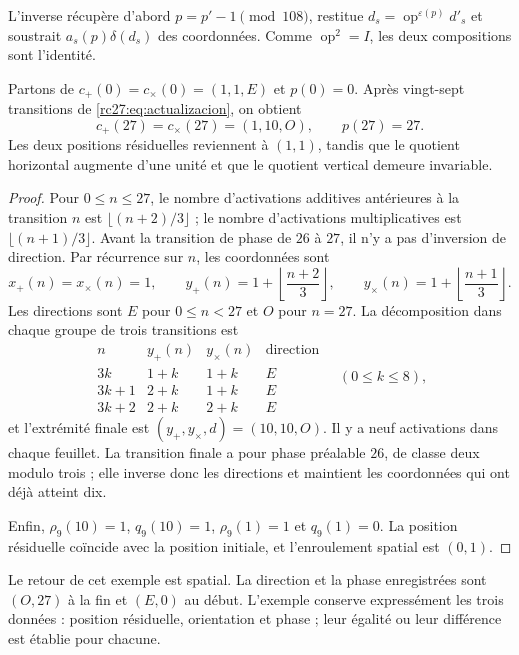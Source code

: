 L'inverse récupère d'abord $p=p'-1\pmod{108}$, restitue
$d_s=\operatorname{op}^{\varepsilon(p)}d'_s$ et soustrait
$a_s(p)\delta(d_s)$ des coordonnées. Comme
$\operatorname{op}^2=I$, les deux compositions sont l'identité.

\begin{theorem}
\label{rc27:thm:ejemplo}
Partons de
$c_+(0)=c_\times(0)=(1,1,E)$ et $p(0)=0$.
Après vingt-sept transitions de
\eqref{rc27:eq:actualizacion}, on obtient
\[
c_+(27)=c_\times(27)=(1,10,O),\qquad p(27)=27.
\]
Les deux positions résiduelles reviennent à $(1,1)$, tandis que le
quotient horizontal augmente d'une unité et que le quotient vertical demeure
invariable.
\end{theorem}
\begin{proof}
Pour $0\le n\le27$, le nombre d'activations additives antérieures
à la transition $n$ est $\lfloor(n+2)/3\rfloor$ ; le nombre
d'activations multiplicatives est $\lfloor(n+1)/3\rfloor$. Avant
la transition de phase de $26$ à $27$, il n'y a pas d'inversion de direction.
Par récurrence sur $n$, les coordonnées sont
\[
x_+(n)=x_\times(n)=1,\qquad
y_+(n)=1+\left\lfloor\frac{n+2}{3}\right\rfloor,\qquad
y_\times(n)=1+\left\lfloor\frac{n+1}{3}\right\rfloor.
\]
Les directions sont $E$ pour $0\le n<27$ et $O$ pour $n=27$.
La décomposition dans chaque groupe de trois transitions est
\[
\begin{array}{c|c|c|c}
n&y_+(n)&y_\times(n)&\text{direction}\\\hline
3k&1+k&1+k&E\\
3k+1&2+k&1+k&E\\
3k+2&2+k&2+k&E
\end{array}
\quad(0\le k\le8),
\]
et l'extrémité finale est $(y_+,y_\times,d)=(10,10,O)$.
Il y a neuf activations dans chaque feuillet. La transition finale a pour phase
préalable $26$, de classe deux modulo trois ; elle inverse donc les
directions et maintient les coordonnées qui ont déjà atteint dix.

Enfin, $\rho_9(10)=1$, $q_9(10)=1$,
$\rho_9(1)=1$ et $q_9(1)=0$. La position résiduelle coïncide avec
la position initiale, et l'enroulement spatial est $(0,1)$.
\end{proof}

Le retour de cet exemple est spatial. La direction et la phase
enregistrées sont $(O,27)$ à la fin et $(E,0)$ au début. L'exemple
conserve expressément les trois données : position résiduelle, orientation et
phase ; leur égalité ou leur différence est établie pour chacune.

